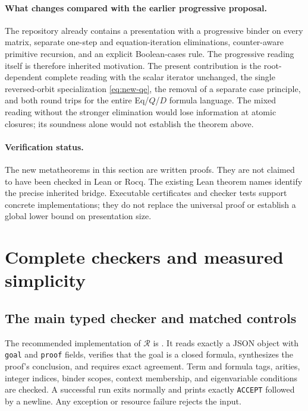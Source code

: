 \documentclass[11pt,a4paper]{article}
\theoremstyle{definition}
\begin{document}
\paragraph{What changes compared with the earlier progressive proposal.}
The repository already contains a presentation with a progressive binder
on every matrix, separate one-step and equation-iteration eliminations,
counter-aware primitive recursion, and an explicit Boolean-cases rule.\cite{progressive}
The progressive reading itself is therefore inherited motivation.  The
present contribution is the root-dependent complete reading with the scalar
iterator unchanged, the single reversed-orbit specialization
\eqref{eq:new-qe}, the removal of a separate case principle, and both
round trips for the entire Eq/$Q$/$D$ formula language.  The mixed reading
without the stronger elimination would lose information at atomic closures;
its soundness alone would not establish the theorem above.

\paragraph{Verification status.}
The new metatheorems in this section are written proofs.  They are not claimed
to have been checked in Lean or Rocq.  The existing Lean theorem names identify
the precise inherited bridge.  Executable certificates and checker tests
support concrete implementations; they do not replace the universal proof
or establish a global lower bound on presentation size.


\section{Complete checkers and measured simplicity}
\label{sec:comparison}

\subsection{The main typed checker and matched controls}

The recommended implementation of $\mathcal R$ is
. It reads exactly a JSON object with
\texttt{goal} and \texttt{proof} fields, verifies that the goal is a
closed formula, synthesizes the proof's conclusion, and requires exact
agreement. Term and formula tags, arities, integer indices, binder scopes,
context membership, and eigenvariable conditions are checked. A successful
run exits normally and prints exactly \texttt{ACCEPT} followed by a
newline. Any exception or resource failure rejects the input.
\end{document}
